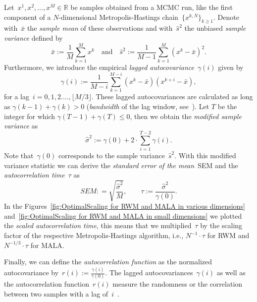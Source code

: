 Let~$x^1, x^2, \dots, x^M \in \mathbb{R}$ be samples obtained from a MCMC run, like the first component of a $N$-dimensional Metropolis-Hastings chain~$\{ x^{k,N} \}_{k \geq 1}$. Denote with~$\bar{x}$ the \textit{sample mean} of these observations and with~$\hat{s}^2$ the unbiased \textit{sample variance}  defined by
\begin{equation*}
 \bar{x} := \frac{1}{M}\sum_{k=1}^M x^k \quad \text{and} \quad \hat{s}^2 := \frac{1}{M -1} \sum_{k=1}^{M}(x^k - \bar{x})^2.
\end{equation*}
Furthermore, we introduce the empirical \textit{lagged autocovariance}~$\gamma(i)$ given by
\begin{equation*}
 \gamma(i) := \frac{1}{M - i} \sum_{k = 1}^{M-i}(x^k - \bar{x})(x^{k+i} - \bar{x}),
\end{equation*}
for a lag~$i = 0, 1, 2. \dots, \lfloor M/3 \rfloor $. These lagged autocovariances are calculated as long as $ \gamma(k-1) + \gamma(k) > 0$ (\textit{bandwidth} of the lag window, see~\autocite[Section 3.3]{Geyer1992}). Let $T $ be the integer for which  $ \gamma(T-1) + \gamma(T) \leq 0$, then we obtain the \textit{modified sample variance} as
\begin{equation*}
 \hat{\sigma}^2 := \gamma(0) + 2 \cdot \sum_{i=1}^{T-2}\gamma(i).
\end{equation*}
Note that~$\gamma(0)$ corresponds to the sample variance~$\hat{s}^2$. With this modified variance statistic we can derive the \textit{standard error of the mean}~SEM and the \textit{autocorrelation time}~$\tau$ as
\begin{equation*}
 SEM : = \sqrt{\frac{\hat{\sigma}^2}{M}}, \qquad \tau := \frac{\hat{\sigma}^2}{\gamma(0)}.
\end{equation*}
In the Figures~\ref{fig:OptimalScaling for RWM and MALA in various dimensions} and~\ref{fig:OptimalScaling for RWM and MALA in small dimensions} we plotted the \textit{scaled autocorrelation time}, this means that we multiplied~$\tau$ by the scaling factor of the respective Metropolis-Hastings algorithm, i.e., $N^{-1}\cdot \tau$ for RWM and $N^{-1/3}\cdot \tau$ for MALA. 

Finally, we can define the \textit{autocorrelation function} as the normalized autocovariance by~$r(i) := \tfrac{\gamma(i)}{\gamma(0)}$. The lagged autocovariances~$\gamma(i)$ as well as the autocorrelation function~$r(i)$ measure the randomness or the correlation between two samples with a lag of~$i$~\autocite{Priestley1982}. 





